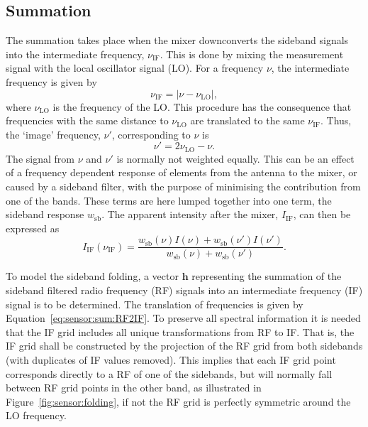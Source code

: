\subsection{Summation}
\label{sec:sensor:sum}
The summation takes place when the mixer downconverts the sideband signals into the intermediate frequency, $\nu_\mathrm{IF}$. This is done by mixing the measurement signal with the local oscillator signal (LO).
For a frequency $\nu$, the intermediate frequency is given by
\begin{equation}
  \label{eq:sensor:sum:v_if} 
  \nu_\mathrm{IF} = \vert \nu - \nu_\mathrm{LO} \vert,
\end{equation}
where $\nu_\mathrm{LO}$ is the frequency of the LO. This procedure has the consequence that frequencies with the same distance to $\nu_\mathrm{LO}$ are translated to the same $\nu_\mathrm{IF}$. Thus, the `image'
frequency, $\nu'$, corresponding to $\nu$ is
\begin{equation}
  \label{eq:sensor:sum:RF2IF}
  \nu' = 2\nu_\mathrm{LO} - \nu.
\end{equation}
The signal from $\nu$ and $\nu'$ is normally not weighted equally.
This can be an effect of a frequency dependent response of elements from
the antenna to the mixer, or caused by a sideband filter, with the
purpose of minimising the contribution from one of the bands. These
terms are here lumped together into one term, the sideband response
$w_\mathrm{sb}$. The apparent intensity after the mixer,
$I_\mathrm{IF}$, can then be expressed as
\begin{equation}
  \label{eq:sensor:sum:I_IF} 
  I_\mathrm{IF}(\nu_\mathrm{IF}) = \frac{w_\mathrm{sb}(\nu)I(\nu) + 
    w_\mathrm{sb}(\nu')I(\nu')}{w_\mathrm{sb}(\nu) + w_\mathrm{sb}(\nu')}.
\end{equation} 

To model the sideband folding, a vector $\mathbf{h}$ representing
the summation of the sideband filtered radio frequency (RF) signals
into an intermediate frequency (IF) signal is to be determined. The
translation of frequencies is given by Equation~\ref{eq:sensor:sum:RF2IF}. To
preserve all spectral information it is needed that the IF grid
includes all unique transformations from RF to IF. That is, the IF
grid shall be constructed by the projection of the RF grid from both
sidebands (with duplicates of IF values removed). This implies that
each IF grid point corresponds directly to a RF of one of the
sidebands, but will normally fall between RF grid points in the
other band, as illustrated in Figure~\ref{fig:sensor:folding}, 
if not the RF grid is perfectly symmetric around the LO frequency.

